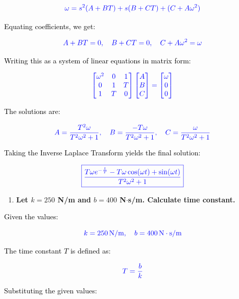 \documentclass{article}
\begin{document}
\[
	\textcolor{blue}{\omega = s^2(A + BT) + s(B + CT) + (C + A\omega^2)}
\]

\noindent
\textcolor{black}{Equating coefficients, we get:}

\[
	\textcolor{blue}{A + BT = 0, \quad B + CT = 0, \quad C + A\omega^2 = \omega}
\]

\noindent
\textcolor{black}{Writing this as a system of linear equations in matrix form:}

\[
	\textcolor{blue}{
		\begin{bmatrix}
			\omega^2 & 0 & 1 \\
			0        & 1 & T \\
			1        & T & 0 
		\end{bmatrix}
		\begin{bmatrix}
			A \\
			B \\
			C 
		\end{bmatrix}
		=
		\begin{bmatrix}
			\omega \\
			0      \\
			0      
		\end{bmatrix}
	}
\]

\noindent
\textcolor{black}{The solutions are:}

\[
	\textcolor{blue}{A = \frac{T^2 \omega}{T^2 \omega^2 + 1}, \quad B = \frac{-T\omega}{T^2 \omega^2 + 1}, \quad C = \frac{\omega}{T^2 \omega^2 + 1}}
\]

\noindent
\textcolor{black}{Taking the Inverse Laplace Transform yields the final solution:}

\[
	\textcolor{blue}{\boxed{\frac{T\omega e^{-\frac{t}{T}} - T\omega \cos(\omega t) + \sin(\omega t)}{T^2 \omega^2 + 1}}}
\]
\newpage
	      
\begin{enumerate}
	\item[(d)] \textbf{Let $k = 250$ N/m and $b = 400$ N$\cdot$s/m. Calculate time constant.}
\end{enumerate}
\noindent
\textcolor{black}{Given the values:}

\[
	\textcolor{blue}{k = 250 \, \text{N/m}, \quad b = 400 \, \text{N}\cdot\text{s/m}}
\]

\noindent
\textcolor{black}{The time constant \( T \) is defined as:}

\[
	\textcolor{blue}{T = \frac{b}{k}}
\]

\noindent
\textcolor{black}{Substituting the given values:}
\end{document}
